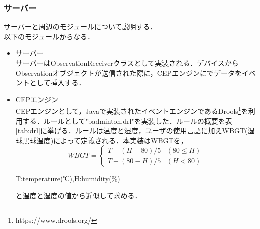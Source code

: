 \documentclass{kuisthesis}			%
\begin{document}
\subsubsection{サーバー}
サーバーと周辺のモジュールについて説明する．\\
以下のモジュールからなる．\\
\begin{itemize}
\item サーバー\\
サーバーはObservationReceiverクラスとして実装される．デバイスからObservationオブジェクトが送信された際に，CEPエンジンにでデータをイベントとして挿入する．
\item CEPエンジン\\
CEPエンジンとして，Javaで実装されたイベントエンジンであるDrools\footnote{https://www.drools.org/}を利用する．ルールとして"badminton.drl"を実装した．ルールの概要を表\ref{tab:drl}に挙げる．ルールは温度と湿度，ユーザの使用言語に加えWBGT(湿球黒球温度)によって定義される．本実装はWBGTを，
\begin{equation}
WBGT = \begin{cases}
T + (H - 80)/5 & (80 \leq H) \\
T -(80 -H)/5 & (H < 80)
\end{cases}
\end{equation}
\begin{flushright}
T:temperature(℃),H:humidity(\%)
\end{flushright}
と温度と湿度の値から近似して求める．


\end{itemize}
\end{document}
